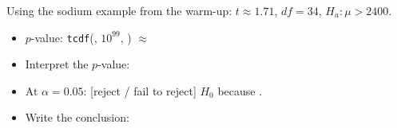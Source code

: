 \documentclass[10pt]{article}
\begin{document}
\begin{practicebox}
Using the sodium example from the warm-up: $t \approx 1.71$, $df = 34$, $H_a: \mu > 2400$.

\begin{itemize}
  \item $p$-value: \texttt{tcdf}(\blank{2cm}, $10^{99}$, \blank{2cm}) $\approx$ \blank{2cm}

  \item Interpret the $p$-value: 

  \item At $\alpha = 0.05$: [reject / fail to reject] $H_0$ because \blank{5cm}.

  \item Write the conclusion: 
\end{itemize}
\end{practicebox}
\end{document}
